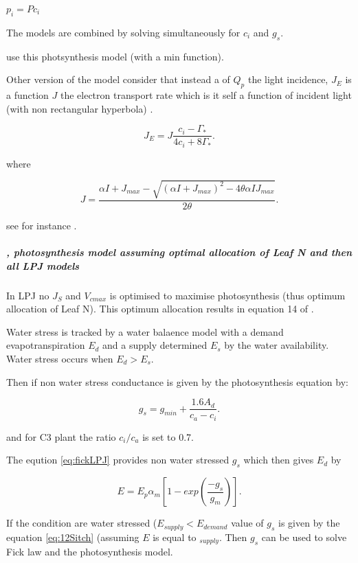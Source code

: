 \documentclass[a4paper,11pt]{article}
\begin{document}
$p_i = P c_i$

The models are combined by solving simultaneously for $c_i$ and $g_s$.

\citet{Scheiter-2009} use this photsynthesis model (with a min function).

Other version of the model consider that instead a of $Q_p$ the light incidence, $J_E$ is a function $J$ the electron transport rate which is it self a function of incident light (with non rectangular hyperbola) \citep{Sharkey-2007}.

\begin{equation}
\label{eq:JCb}
J_E = J \frac{ c_i - \Gamma_*}{4c_i + 8 \Gamma_*}.
\end{equation}

where

\begin{equation}
\label{eq:Jlight}
J = \frac{ \alpha I + J_{max} - \sqrt{(\alpha I + J_{max})^2 - 4 \theta \alpha I J_{max}}}{2\theta}.
\end{equation}

see for instance \citet{Bernacchi-2009}.


\subparagraph{\citet{Haxeltine-1996}, photosynthesis model assuming optimal allocation of Leaf N and then all LPJ models}

In LPJ no $J_S$ and $V_{cmax}$ is optimised to maximise photosynthesis (thus optimum allocation of Leaf N). This optimum allocation results in equation 14 of \citet{Sitch-2008}.

Water stress is tracked by a water balaence model with a demand evapotranspiration $E_d$ and a supply determined $E_s$ by the water availability. Water stress occurs when $E_d > E_s$.

Then if non water stress conductance is given by the photosynthesis equation by:

\begin{equation}
\label{eq:fickLPJ}
g_s=g_{min} + \frac{1.6A_d}{c_a - c_i}.
\end{equation}

and for C3 plant the ratio $c_i / c_a$ is set to 0.7.

The eqution \ref{eq:fickLPJ} provides non water stressed $g_s$ which then gives $E_{d}$ by

\begin{equation}
\label{eq:12Sitch}
E=E_p \alpha_m [1 - exp(\frac{- g_s}{g_m})].
\end{equation}

If the condition are water stressed ($E_{supply} < E_{demand}$ value
of $g_s$ is given by the equation \ref{eq:12Sitch} (assuming $E$ is
equal to $_{supply}$. Then $g_s$ can be used to solve Fick law and the
photosynthesis model.
\end{document}
